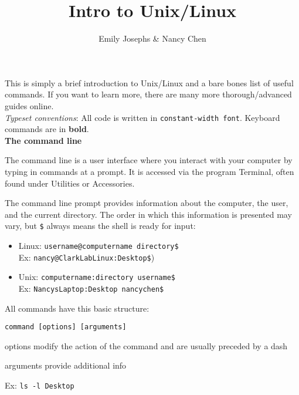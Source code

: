 \documentclass[11pt]{article}
\title{Intro to Unix/Linux}
\author{Emily Josephs \& Nancy Chen}
\begin{document}
\maketitle

This is simply a brief introduction to Unix/Linux and a bare bones list of useful commands. If you want to learn more, there are many more thorough/advanced guides online.\\
\textsl{Typeset conventions}: All code is written in \texttt{constant-width font}. Keyboard commands are in \textbf{bold}.\\ 

\textbf{The command line}

The command line is a user interface where you interact with your computer by typing in commands at a prompt. It is accessed via the program Terminal, often found under Utilities or Accessories.

The command line prompt provides information about the computer, the user, and the current directory. The order in which this information is presented may vary, but \texttt{\$} always means the shell is ready for input:
\begin{itemize}
\item Linux: \texttt{username@computername directory\$}\\
 Ex: \texttt{nancy@ClarkLabLinux:Desktop\$})
\item Unix: \texttt{computername:directory username\$}\\
Ex: \texttt{NancysLaptop:Desktop nancychen\$}
\end{itemize}

All commands have this basic structure:

\texttt{command [options] [arguments]}
\begin{itemize*}
\item options modify the action of the command and are usually preceded by a dash
\item arguments provide additional info
\item Ex: \texttt{ls -l Desktop}
\end{itemize*}
\end{document}

